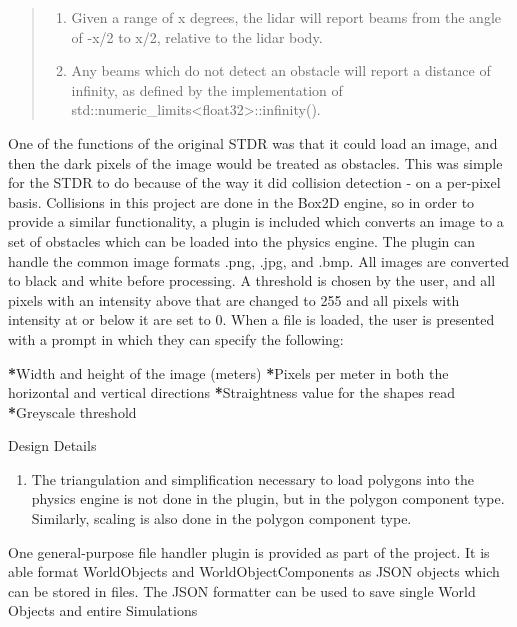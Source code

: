 \documentclass[letterpaper,10pt,english]{sphinxmanual}
\begin{document}
\begin{quote}
\begin{description}
\begin{enumerate}
\item {} 
Given a range of x degrees, the lidar will report beams from the angle of -x/2 to x/2, relative to the lidar body.

\item {} 
Any beams which do not detect an obstacle will report a distance of infinity, as defined by the implementation of std::numeric\_limits\textless{}float32\textgreater{}::infinity().

\end{enumerate}

\end{description}


\end{quote}


One of the functions of the original STDR was that it could load an image, and then the dark pixels of the image would be treated as obstacles. This was
simple for the STDR to do because of the way it did collision detection - on a per-pixel basis. Collisions in this project are done in the Box2D engine,
so in order to provide a similar functionality, a plugin is included which converts an image to a set of obstacles which can be loaded into the physics engine.
The plugin can handle the common image formats .png, .jpg, and .bmp. All images are converted to black and white before processing. A threshold is chosen by the
user, and all pixels with an intensity above that are changed to 255 and all pixels with intensity at or below it are set to 0. When a file is loaded, the user is
presented with a prompt in which they can specify the following:

{\color{red}\bfseries{}*}Width and height of the image (meters)
{\color{red}\bfseries{}*}Pixels per meter in both the horizontal and vertical directions
{\color{red}\bfseries{}*}Straightness value for the shapes read
{\color{red}\bfseries{}*}Greyscale threshold

Design Details
\begin{enumerate}
\item {} 
The triangulation and simplification necessary to load polygons into the physics engine is not done in the plugin, but in the polygon component type. Similarly, scaling is also done in the polygon component type.

\end{enumerate}


One general-purpose file handler plugin is provided as part of the project. It is able format WorldObjects and WorldObjectComponents as JSON objects which can be
stored in files. The JSON formatter can be used to save single World Objects and entire Simulations
\end{document}
